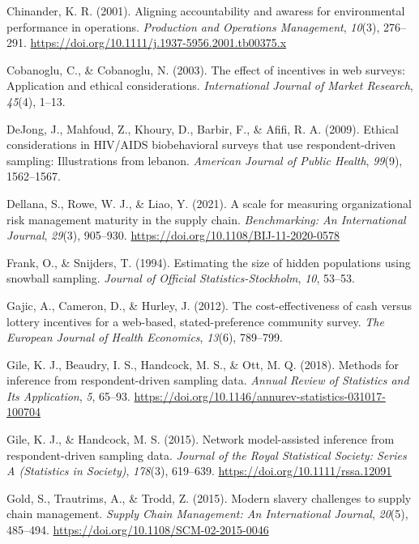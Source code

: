 \documentclass[
  12pt,
]{article}
\newlength{\cslhangindent}
\newenvironment{CSLReferences}[2] %
 {\begin{list}{}{%
  \setlength{\itemindent}{0pt}
  \setlength{\leftmargin}{0pt}
  \setlength{\parsep}{0pt}
  \ifodd #1
   \setlength{\leftmargin}{\cslhangindent}
   \setlength{\itemindent}{-1\cslhangindent}
  \fi
  \setlength{\itemsep}{#2\baselineskip}}}
 {\end{list}}
\theoremstyle{plain}
\theoremstyle{definition}
\begin{document}
\begin{CSLReferences}{1}{0}
Chinander, K. R. (2001). Aligning accountability and awaress for
environmental performance in operations. \emph{Production and Operations
Management}, \emph{10}(3), 276--291.
\url{https://doi.org/10.1111/j.1937-5956.2001.tb00375.x}

Cobanoglu, C., \& Cobanoglu, N. (2003). The effect of incentives in web
surveys: Application and ethical considerations. \emph{International
Journal of Market Research}, \emph{45}(4), 1--13.

DeJong, J., Mahfoud, Z., Khoury, D., Barbir, F., \& Afifi, R. A. (2009).
Ethical considerations in {HIV}/{AIDS} biobehavioral surveys that use
respondent-driven sampling: Illustrations from lebanon. \emph{American
Journal of Public Health}, \emph{99}(9), 1562--1567.

Dellana, S., Rowe, W. J., \& Liao, Y. (2021). A scale for measuring
organizational risk management maturity in the supply chain.
\emph{Benchmarking: An International Journal}, \emph{29}(3), 905--930.
\url{https://doi.org/10.1108/BIJ-11-2020-0578}

Frank, O., \& Snijders, T. (1994). Estimating the size of hidden
populations using snowball sampling. \emph{Journal of Official
Statistics-Stockholm}, \emph{10}, 53--53.

Gajic, A., Cameron, D., \& Hurley, J. (2012). The cost-effectiveness of
cash versus lottery incentives for a web-based, stated-preference
community survey. \emph{The European Journal of Health Economics},
\emph{13}(6), 789--799.

Gile, K. J., Beaudry, I. S., Handcock, M. S., \& Ott, M. Q. (2018).
Methods for inference from respondent-driven sampling data. \emph{Annual
Review of Statistics and Its Application}, \emph{5}, 65--93.
\url{https://doi.org/10.1146/annurev-statistics-031017-100704}

Gile, K. J., \& Handcock, M. S. (2015). Network model-assisted inference
from respondent-driven sampling data. \emph{Journal of the Royal
Statistical Society: Series A (Statistics in Society)}, \emph{178}(3),
619--639. \url{https://doi.org/10.1111/rssa.12091}

Gold, S., Trautrims, A., \& Trodd, Z. (2015). Modern slavery challenges
to supply chain management. \emph{Supply Chain Management: An
International Journal}, \emph{20}(5), 485--494.
\url{https://doi.org/10.1108/SCM-02-2015-0046}


\end{CSLReferences}
\end{document}
